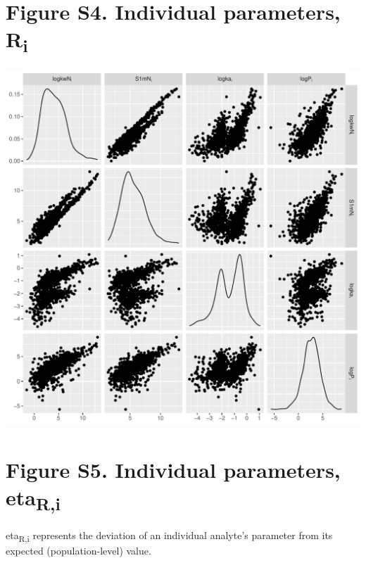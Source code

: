 \documentclass[
]{article}
\begin{document}
\newpage{}

\hypertarget{figure-s4.-individual-parameters-ri}{%
\section{\texorpdfstring{Figure S4. Individual parameters,
R\textsubscript{i}}{Figure S4. Individual parameters, Ri}}\label{figure-s4.-individual-parameters-ri}}

\includegraphics{../deliv/figures/manuscript/supplement/iparam.pdf}

\newpage{}

\hypertarget{figure-s5.-individual-parameters-etari}{%
\section{\texorpdfstring{Figure S5. Individual parameters,
eta\textsubscript{R,i}}{Figure S5. Individual parameters, etaR,i}}\label{figure-s5.-individual-parameters-etari}}

eta\textsubscript{R,i} represents the deviation of an individual
analyte's parameter from its expected (population-level) value.
\end{document}
